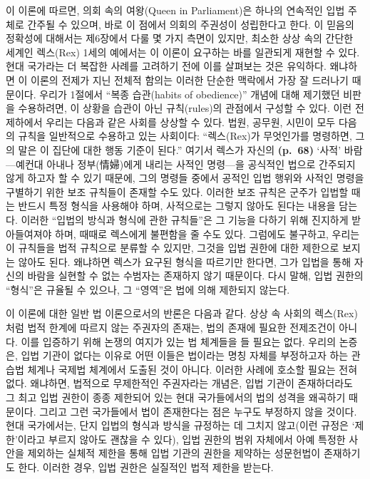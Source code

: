 이 이론에 따르면, 의회 속의 여왕(Queen in Parliament)은 하나의 연속적인
입법 주체로 간주될 수 있으며, 바로 이 점에서 의회의 주권성이 성립한다고
한다. 이 믿음의 정확성에 대해서는 제6장에서 다룰 몇 가지 측면이 있지만,
최소한 상상 속의 간단한 세계인 렉스(Rex) 1세의 예에서는 이 이론이
요구하는 바를 일관되게 재현할 수 있다. 현대 국가라는 더 복잡한 사례를
고려하기 전에 이를 살펴보는 것은 유익하다. 왜냐하면 이 이론의 전제가
지닌 전체적 함의는 이러한 단순한 맥락에서 가장 잘 드러나기 때문이다.
우리가 1절에서 ``복종 습관(habits of obedience)'' 개념에 대해 제기했던
비판을 수용하려면, 이 상황을 습관이 아닌 규칙(rules)의 관점에서 구성할
수 있다. 이런 전제하에서 우리는 다음과 같은 사회를 상상할 수 있다. 법원,
공무원, 시민이 모두 다음의 규칙을 일반적으로 수용하고 있는 사회이다:
``렉스(Rex)가 무엇인가를 명령하면, 그의 말은 이 집단에 대한 행동 기준이
된다.'' 여기서 렉스가 자신의 \textbf{(p.~68)} `사적' 바람---예컨대
아내나 정부(情婦)에게 내리는 사적인 명령---을 공식적인 법으로 간주되지
않게 하고자 할 수 있기 때문에, 그의 명령들 중에서 공적인 입법 행위와
사적인 명령을 구별하기 위한 보조 규칙들이 존재할 수도 있다. 이러한 보조
규칙은 군주가 입법할 때는 반드시 특정 형식을 사용해야 하며, 사적으로는
그렇지 않아도 된다는 내용을 담는다. 이러한 ``입법의 방식과 형식에 관한
규칙들''은 그 기능을 다하기 위해 진지하게 받아들여져야 하며, 때때로
렉스에게 불편함을 줄 수도 있다. 그럼에도 불구하고, 우리는 이 규칙들을
법적 규칙으로 분류할 수 있지만, 그것을 입법 권한에 대한 제한으로 보지는
않아도 된다. 왜냐하면 렉스가 요구된 형식을 따르기만 한다면, 그가 입법을
통해 자신의 바람을 실현할 수 없는 수범자는 존재하지 않기 때문이다. 다시
말해, 입법 권한의 ``형식''은 규율될 수 있으나, 그 ``영역''은 법에 의해
제한되지 않는다.

이 이론에 대한 일반 법 이론으로서의 반론은 다음과 같다. 상상 속 사회의
렉스(Rex)처럼 법적 한계에 따르지 않는 주권자의 존재는, 법의 존재에
필요한 전제조건이 아니다. 이를 입증하기 위해 논쟁의 여지가 있는 법
체계들을 들 필요는 없다. 우리의 논증은, 입법 기관이 없다는 이유로 어떤
이들은 법이라는 명칭 자체를 부정하고자 하는 관습법 체계나 국제법
체계에서 도출된 것이 아니다. 이러한 사례에 호소할 필요는 전혀 없다.
왜냐하면, 법적으로 무제한적인 주권자라는 개념은, 입법 기관이
존재하더라도 그 최고 입법 권한이 종종 제한되어 있는 현대 국가들에서의
법의 성격을 왜곡하기 때문이다. 그리고 그런 국가들에서 법이 존재한다는
점은 누구도 부정하지 않을 것이다. 현대 국가에서는, 단지 입법의 형식과
방식을 규정하는 데 그치지 않고(이런 규정은 `제한'이라고 부르지 않아도
괜찮을 수 있다), 입법 권한의 범위 자체에서 아예 특정한 사안을 제외하는
실체적 제한을 통해 입법 기관의 권한을 제약하는 성문헌법이 존재하기도
한다. 이러한 경우, 입법 권한은 실질적인 법적 제한을 받는다.

